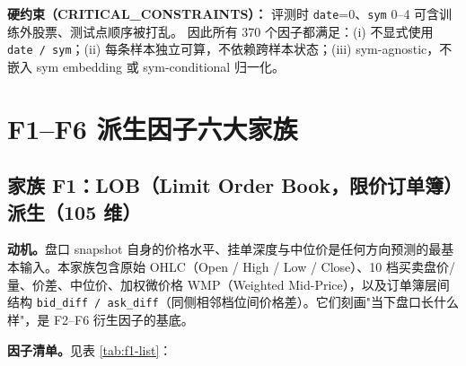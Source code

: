 \documentclass[10.5pt,a4paper]{article}
\begin{document}
\textbf{硬约束（CRITICAL\_CONSTRAINTS）：} 评测时 \texttt{date}=0、\texttt{sym} 0--4 可含训练外股票、测试点顺序被打乱。
因此所有 370 个因子都满足：(i) 不显式使用 \texttt{date / sym}；(ii) 每条样本独立可算，不依赖跨样本状态；(iii) sym-agnostic，不嵌入 sym embedding 或 sym-conditional 归一化。

\section{F1--F6 派生因子六大家族}

\subsection{家族 F1：LOB（Limit Order Book，限价订单簿）派生（105 维）}

\textbf{动机。}盘口 snapshot 自身的价格水平、挂单深度与中位价是任何方向预测的最基本输入。本家族包含原始 OHLC（Open / High / Low / Close）、10 档买卖盘价/量、价差、中位价、加权微价格 WMP（Weighted Mid-Price），以及订单簿层间结构 \texttt{bid\_diff / ask\_diff}（同侧相邻档位间价格差）。它们刻画"当下盘口长什么样"，是 F2--F6 衍生因子的基底。

\textbf{因子清单。}见表 \ref{tab:f1-list}：
\end{document}
